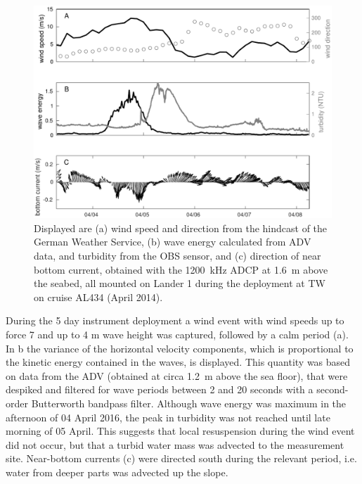  \begin{figure}[ht]
\includegraphics[width=15cm]{bilder/al434tw.pdf}
 \caption{Displayed are (a) wind speed and direction from the hindcast of the 
German Weather Service, (b) wave energy calculated from ADV data, and turbidity 
from the OBS sensor, and (c) direction of near bottom current, obtained with 
the 1200~kHz ADCP at 1.6~m above the seabed, all mounted on Lander 1 during the 
deployment at TW on cruise AL434 (April 2014).}
 \label{tromperwiek}
 \end{figure}
 
During the 5 day instrument deployment a wind event with wind 
speeds up to force 7 and up to 4 m wave height was captured, followed by a calm 
period (a). In b the variance of the 
horizontal velocity components, which is proportional to the kinetic energy 
contained in the waves, is displayed. This quantity was based on data from the 
ADV (obtained 
at circa 1.2~m above the sea floor), that were despiked \citep[][]{goring2002} 
and 
filtered for wave periods between 2 and 20 seconds with a second-order 
Butterworth bandpass filter. Although wave energy was maximum in the afternoon 
of 04 April 2016, the peak in turbidity was not reached until late morning of 
05 April. This suggests that local resuspension during the wind event did not 
occur, but that a turbid water mass was advected to the measurement site. 
Near-bottom currents (c) were directed south during the 
relevant period, i.e. water from deeper parts was advected up the slope.
\FloatBarrier
 
